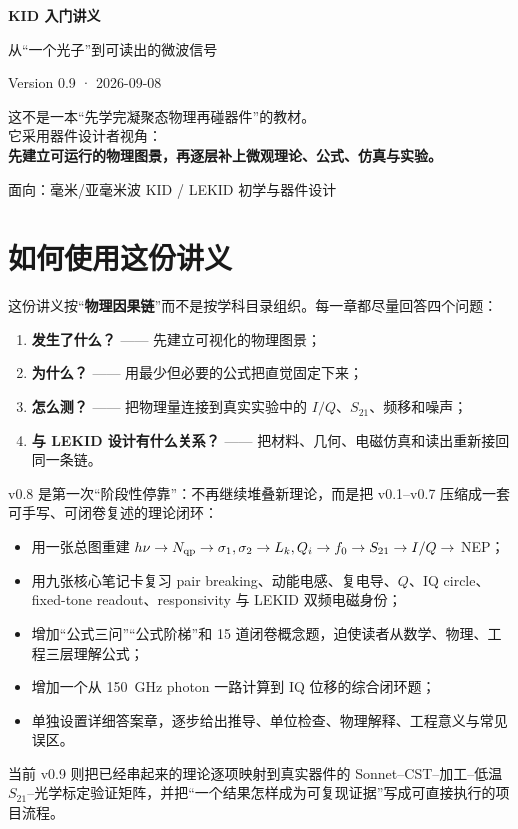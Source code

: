 \documentclass[11pt,a4paper,openany]{ctexrep}
\newcommand{\Stwentyone}{S_{21}}
\begin{document}
\begin{titlepage}
\centering
\vspace*{2.2cm}
{\fontsize{30}{38}\selectfont\bfseries\color{KidDark} KID 入门讲义}\par
\vspace{0.5cm}
{\Large\color{KidBlue} 从“一个光子”到可读出的微波信号}\par
\vspace{1.4cm}
{\large Version 0.9 · 2026-09-08}\par
\vfill
\begin{tcolorbox}[width=0.88\textwidth,colback=KidGray,colframe=KidBlue!55,arc=3mm]
\centering
\large
这不是一本“先学完凝聚态物理再碰器件”的教材。\\[0.5em]
它采用器件设计者视角：\\[0.3em]
\textbf{先建立可运行的物理图景，再逐层补上微观理论、公式、仿真与实验。}
\end{tcolorbox}
\vfill
{\large 面向：毫米/亚毫米波 KID / LEKID 初学与器件设计}\par
\end{titlepage}

\tableofcontents
\clearpage

\chapter*{如何使用这份讲义}
这份讲义按“\textbf{物理因果链}”而不是按学科目录组织。每一章都尽量回答四个问题：
\begin{enumerate}
  \item \textbf{发生了什么？} —— 先建立可视化的物理图景；
  \item \textbf{为什么？} —— 用最少但必要的公式把直觉固定下来；
  \item \textbf{怎么测？} —— 把物理量连接到真实实验中的 $I/Q$、$\Stwentyone$、频移和噪声；
  \item \textbf{与 LEKID 设计有什么关系？} —— 把材料、几何、电磁仿真和读出重新接回同一条链。
\end{enumerate}

v0.8 是第一次“阶段性停靠”：不再继续堆叠新理论，而是把 v0.1--v0.7 压缩成一套可手写、可闭卷复述的理论闭环：
\begin{itemize}
  \item 用一张总图重建 $h\nu\rightarrow N_{\rm qp}\rightarrow\sigma_1,\sigma_2\rightarrow L_k,Q_i\rightarrow f_0\rightarrow S_{21}\rightarrow I/Q\rightarrow$ NEP；
  \item 用九张核心笔记卡复习 pair breaking、动能电感、复电导、$Q$、IQ circle、fixed-tone readout、responsivity 与 LEKID 双频电磁身份；
  \item 增加“公式三问”“公式阶梯”和 15 道闭卷概念题，迫使读者从数学、物理、工程三层理解公式；
  \item 增加一个从 \SI{150}{GHz} photon 一路计算到 IQ 位移的综合闭环题；
  \item 单独设置详细答案章，逐步给出推导、单位检查、物理解释、工程意义与常见误区。
\end{itemize}
当前 v0.9 则把已经串起来的理论逐项映射到真实器件的 Sonnet--CST--加工--低温 $S_{21}$--光学标定验证矩阵，并把“一个结果怎样成为可复现证据”写成可直接执行的项目流程。
\end{document}
